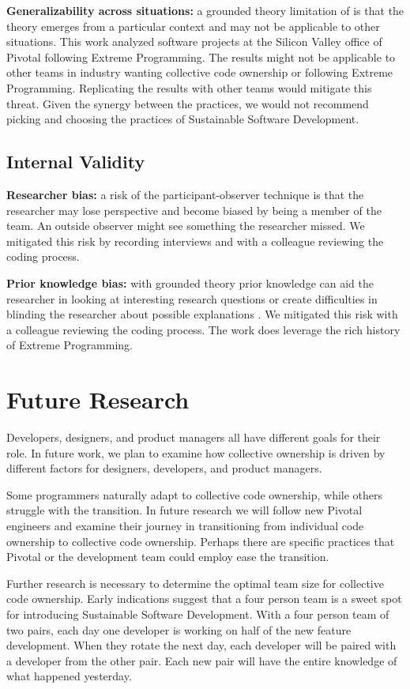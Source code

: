 \begin{table}[]
\textbf{Generalizability across situations:} a grounded theory limitation of  is that the theory emerges from a particular context and may not be applicable to other situations. This work analyzed software projects at the Silicon Valley office of Pivotal following Extreme Programming. The results might not be applicable to other teams in industry wanting collective code ownership or  following Extreme Programming. Replicating the results with other teams would mitigate this threat. Given the synergy between the practices, we would not recommend picking and choosing the practices of Sustainable Software Development.

\subsection{Internal Validity}
\textbf{Researcher bias:} a risk of the participant-observer technique is that the researcher may lose perspective and become biased by being a member of the team. An outside observer might see something the researcher missed. We mitigated this risk by recording interviews and with a colleague reviewing the coding process.

\textbf{Prior knowledge bias:} with grounded theory prior knowledge can aid the researcher in looking at interesting research questions or create difficulties in blinding the researcher about possible explanations \cite{GlaserIssues}. We mitigated this risk with a colleague reviewing the coding process. The work does leverage the rich history of Extreme Programming.
\section{Future Research}
Developers, designers, and product managers all have different goals for their role. In future work,  we plan to examine how collective ownership is driven by different factors for designers, developers, and product managers.

Some programmers naturally adapt to collective code ownership, while others struggle with the transition. In future research we will follow new Pivotal engineers and examine their journey in transitioning from individual code ownership to collective code ownership. Perhaps there are 
specific practices that Pivotal or the development team could employ ease the transition. 

Further research is necessary to determine the optimal team size for collective code ownership. Early indications suggest that a four person team is a sweet spot for introducing Sustainable Software Development. With a four person team of two pairs, each day one developer is working on half of the new feature development. When they rotate the next day, each developer will be paired with a developer from the other pair. Each new pair will have the entire knowledge of what happened yesterday. 



\end{table}
